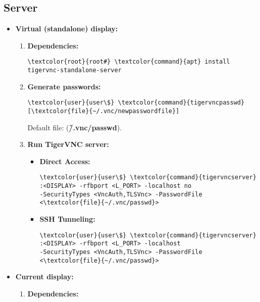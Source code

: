 \documentclass[10pt, a4paper, onecolumn, openany]{book} %
\begin{document}
\subsection{Server}
\begin{itemize}
    \item \textbf{Virtual (standalone) display:}
    \begin{enumerate}
        \item \textbf{Dependencies:}
\begin{Verbatim}[commandchars=\\\{\}]
\textcolor{root}{root#} \textcolor{command}{apt} install tigervnc-standalone-server
\end{Verbatim}
        \item \textbf{Generate passwords:}
\begin{Verbatim}[commandchars=\\\{\}]
\textcolor{user}{user\$} \textcolor{command}{tigervncpasswd} [\textcolor{file}{~/.vnc/newpasswordfile}]
\end{Verbatim}
Default file: (\textbf{\textcolor{file}{\~/.vnc/passwd}}).
        \item \textbf{Run TigerVNC server:}
        \begin{itemize}
            \item \textbf{Direct Access:}
\begin{Verbatim}[commandchars=\\\{\}]
\textcolor{user}{user\$} \textcolor{command}{tigervncserver} :<DISPLAY> -rfbport <L_PORT> -localhost no
-SecurityTypes <VncAuth,TLSVnc> -PasswordFile <\textcolor{file}{~/.vnc/passwd}>
\end{Verbatim}            
            \item \textbf{SSH Tunneling:}
\begin{Verbatim}[commandchars=\\\{\}]
\textcolor{user}{user\$} \textcolor{command}{tigervncserver} :<DISPLAY> -rfbport <L_PORT> -localhost
-SecurityTypes <VncAuth,TLSVnc> -PasswordFile <\textcolor{file}{~/.vnc/passwd}>
\end{Verbatim}
        \end{itemize}
    \end{enumerate}
    \item \textbf{Current display:}
    \begin{enumerate}
        \item \textbf{Dependencies:}
\begin{Verbatim}[commandchars=\\\{\}]

\end{Verbatim}
\end{enumerate}
\end{itemize}
\end{document}
